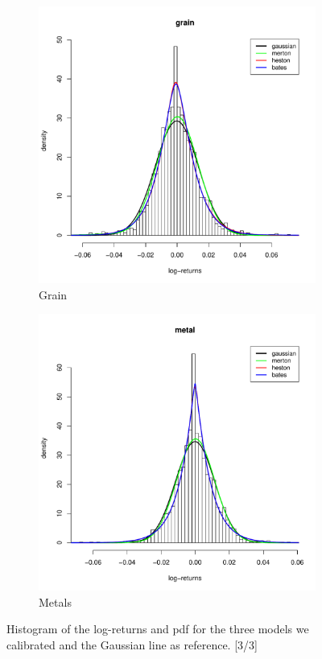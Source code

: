 \begin{figure}
	\begin{subfigure}{0.44\textwidth}
		\centering
		\includegraphics[width=\linewidth]{Images/hist_grain.pdf}
		\caption{Grain}
	\end{subfigure}
	\begin{subfigure}{0.44\textwidth}
		\centering
		\includegraphics[width=\linewidth]{Images/hist_metal.pdf}
		\caption{Metals}
	\end{subfigure}
	
	\caption[Histrogram and densities of the results (3/3)]{Histogram of the log-returns and pdf for the three models we calibrated and the Gaussian line as reference. [3/3]}
	\label{fig:hist_3}
\end{figure}

